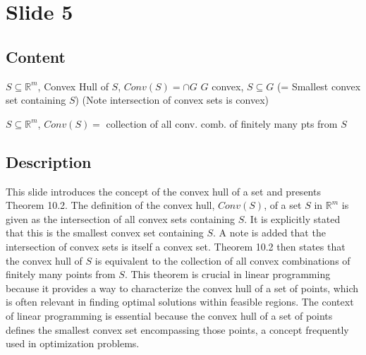 \documentclass{article}%
\begin{document}
%
\newpage%
\section{Slide 5}%
\label{sec:Slide5}%
\subsection{Content}%

\underline{} \quad $S \subseteq \mathbb{R}^m$, Convex Hull of $S$,
$Conv(S) = \cap G$
$G$ convex, $S \subseteq G$
(= Smallest convex set containing $S$)
(Note intersection of convex sets is convex)

\underline{} \quad $S \subseteq \mathbb{R}^m$, $Conv(S) = $ collection of
all conv. comb. of finitely many pts from $S$
%
\subsection{Description}%
This slide introduces the concept of the convex hull of a set and presents Theorem 10.2.  The definition of the convex hull, $Conv(S)$, of a set $S$ in $\mathbb{R}^m$ is given as the intersection of all convex sets containing $S$.  It is explicitly stated that this is the smallest convex set containing $S$.  A note is added that the intersection of convex sets is itself a convex set.  Theorem 10.2 then states that the convex hull of $S$ is equivalent to the collection of all convex combinations of finitely many points from $S$. This theorem is crucial in linear programming because it provides a way to characterize the convex hull of a set of points, which is often relevant in finding optimal solutions within feasible regions. The context of linear programming is essential because the convex hull of a set of points defines the smallest convex set encompassing those points, a concept frequently used in optimization problems.%
\end{document}

